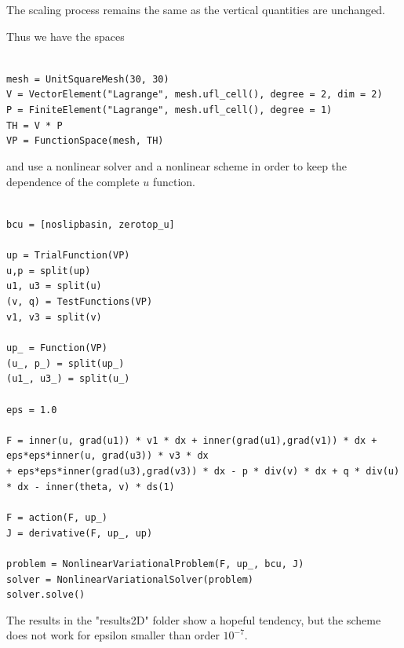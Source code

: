 \documentclass[11pt]{article}
\begin{document}
The scaling process remains the same as the vertical quantities are unchanged.

Thus we have the spaces

\texttt{
\\
mesh = UnitSquareMesh(30, 30)\\
V = VectorElement("Lagrange", mesh.ufl\_cell(), degree = 2, dim = 2)\\
P = FiniteElement("Lagrange", mesh.ufl\_cell(), degree = 1)\\
TH = V * P\\
VP = FunctionSpace(mesh, TH)\\
}

and use a nonlinear solver and a nonlinear scheme in order to keep the dependence of the complete $u$ function.

\texttt{
\\
bcu = [noslipbasin, zerotop\_u]\\
\\
up = TrialFunction(VP)\\
u,p = split(up)\\
u1, u3 = split(u)\\
(v, q) = TestFunctions(VP)\\
v1, v3 = split(v)\\
\\
up\_ = Function(VP)\\
(u\_, p\_) = split(up\_)\\
(u1\_, u3\_) = split(u\_)\\
\\
eps = 1.0 \\
\\
F = inner(u, grad(u1)) * v1 * dx + inner(grad(u1),grad(v1)) * dx + eps*eps*inner(u, grad(u3)) * v3 * dx\\
+ eps*eps*inner(grad(u3),grad(v3)) * dx - p * div(v) * dx + q * div(u) * dx - inner(theta, v) * ds(1)\\
\\
F = action(F, up\_)\\
J  = derivative(F, up\_, up)\\
\\
problem = NonlinearVariationalProblem(F, up\_, bcu, J)\\
solver  = NonlinearVariationalSolver(problem) \\
solver.solve()\\
}

The results in the "results2D" folder show a hopeful tendency, but the scheme does not work for epsilon smaller than order $10^{-7}.$
\end{document}
